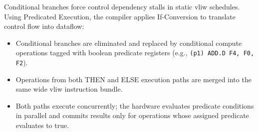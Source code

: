 Conditional branches force control dependency stalls in static \gls{vliw} schedules. Using Predicated Execution, the compiler applies If-Conversion to translate control flow into dataflow:

\begin{itemize}
    \item Conditional branches are eliminated and replaced by conditional compute operations tagged with boolean predicate registers (e.g., \texttt{(p1) ADD.D F4, F0, F2}).
    \item Operations from both \textsf{THEN} and \textsf{ELSE} execution paths are merged into the same wide \gls{vliw} instruction bundle.
    \item Both paths execute concurrently; the hardware evaluates predicate conditions in parallel and commits results only for operations whose assigned predicate evaluates to \textsf{true}.
\end{itemize}